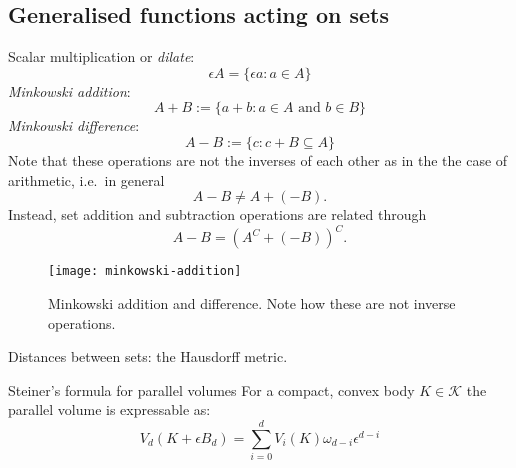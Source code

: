 \subsection{Generalised functions acting on sets}

Scalar multiplication or \emph{dilate}:
\begin{equation}
  \epsilon A = \{\epsilon a : a \in A\}
\end{equation}
\emph{Minkowski addition}:
\begin{equation}
  A + B := \{ a + b : a \in A \textrm{ and } b \in B \}
\end{equation}
\emph{Minkowski difference}:
\begin{equation}
  A - B := \{ c : c + B \subseteq A \}
\end{equation}
Note that these operations are not the inverses of each other as in the the case of arithmetic, i.e.\ in general
\begin{equation*}
  A - B \ne A + (-B).
\end{equation*}
Instead, set addition and subtraction operations are related through
\begin{equation*}
  A - B = (A^C + (-B))^C.
\end{equation*}


\begin{SCfigure}
  \texttt{[image: minkowski-addition]}
  \caption[Minkowski addition and difference]{
    Minkowski addition and difference.
    Note how these are not inverse operations.}
\end{SCfigure}

Distances between sets: the Hausdorff metric.

\begin{theorem}{Steiner's formula for parallel volumes}
  For a compact, convex body $K \in \mathcal{K}$ the parallel volume is expressable as:
  \begin{equation}
    V_d(K + \epsilon B_d) =
    \sum_{i=0}^d V_i(K) \omega_{d-i} \epsilon^{d-i}
  \end{equation}
\end{theorem}

